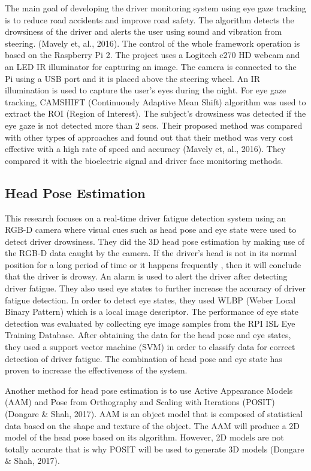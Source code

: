 The main goal of developing the driver monitoring system using eye gaze tracking is to reduce road accidents and improve road safety. The algorithm detects the drowsiness of the driver and alerts the user using sound and vibration from steering. (Mavely et, al., 2016). The control of the whole framework operation is based on the Raspberry Pi 2. The project uses a Logitech c270 HD webcam and an LED IR illuminator for capturing an image. The camera is connected to the Pi using a USB port and it is placed above the steering wheel. An IR illumination is used to capture the user’s eyes during the night. For eye gaze tracking, CAMSHIFT (Continuously Adaptive Mean Shift) algorithm was used to extract the ROI (Region of Interest). The subject’s drowsiness was detected if the eye gaze is not detected more than 2 secs. Their proposed method was compared with other types of approaches and found out that their method was very cost effective with a high rate of speed and accuracy (Mavely et, al., 2016). They compared it with the bioelectric signal and driver face monitoring methods.

\subsection{Head Pose Estimation}
This research focuses on a real-time driver fatigue detection system using an RGB-D camera where visual cues such as head pose and eye state were used to detect driver drowsiness. They did the 3D head pose estimation by making use of the RGB-D data caught by the camera. If the driver’s head is not in its normal position for a long period of time or it happens frequently , then it will conclude that the driver is drowsy.  An alarm is used to alert the driver after detecting driver fatigue. They also used eye states to further increase the accuracy of driver fatigue detection. In order to detect eye states, they used WLBP (Weber Local Binary Pattern) which is a local image descriptor. The performance of eye state detection was evaluated by collecting eye image samples from the RPI ISL Eye Training Database. After obtaining the data for the head pose and eye states, they used a support vector machine (SVM) in order to classify data for correct detection of driver fatigue. The combination of head pose and eye state has proven to increase the effectiveness of the system.


Another method for head pose estimation is to use Active Appearance Models (AAM) and Pose from Orthography and Scaling with Iterations (POSIT) (Dongare \& Shah, 2017). AAM is an object model that is composed of statistical data based on the shape and texture of the object. The AAM will produce a 2D model of the head pose based on its algorithm. However, 2D models are not totally accurate that is why POSIT will be used to generate 3D models (Dongare \& Shah, 2017).


